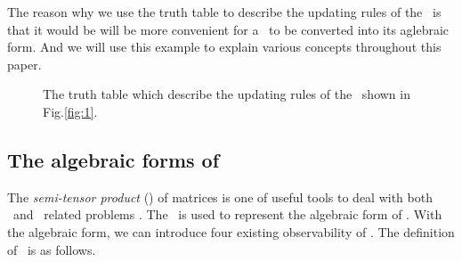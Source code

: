 \begin{example}
The reason why we use the truth table to describe the updating rules of the \BCN\ is that it would be will be more convenient for a \BCN\ to be converted into its aglebraic form. And we will use this example to explain various concepts throughout this paper.
  \begin{figure}[thpb]
      \centering
      
      \caption{The truth table which describe the updating rules of the \BCN\ shown in Fig.\ref{fig:1}.}
      \label{fig:2}
   \end{figure}
   \label{exa:2}
\end{example}   


\subsection{The algebraic forms of \BCNs}
The \emph{semi-tensor product} (\STP) of matrices is one of useful tools to deal with  both \BNs\ and \BCNs\  related problems \cite{cheng2009controllability}. The \STP\ is used to represent the algebraic form of \BCN. With the algebraic form, we can introduce four existing observability of \BCN. The definition of \STP\ is as follows.

